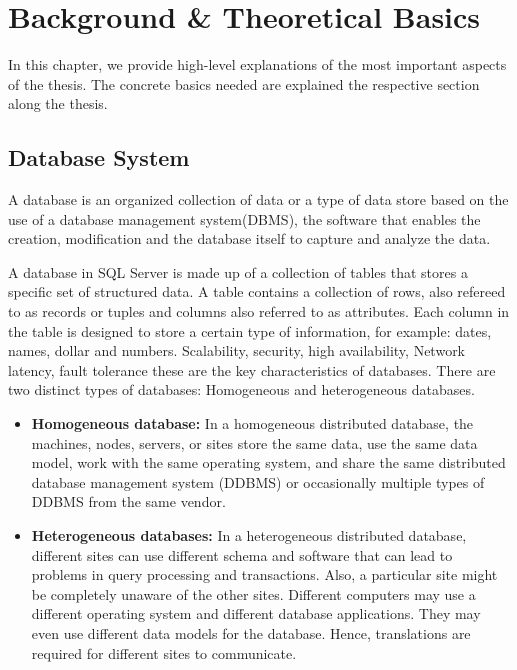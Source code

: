 \section{Background \& Theoretical Basics }

In this chapter, we provide high-level explanations of the most important aspects of the thesis. The concrete basics needed are explained the respective section along the thesis.

\subsection{ Database System}

\begin{definition}
A database is an organized collection of data or a type of data store based on the use of a database management system(DBMS), the software that enables the creation, modification and the database itself to capture and analyze the data.\end{definition}
A database in SQL Server is made up of a collection of tables that stores a specific set of structured data. A table contains a collection of rows, also refereed to as records or tuples and columns also referred to as attributes. Each column in the table is designed to store a certain type of information, for example: dates, names, dollar and numbers.\cite{williamdassafmsft-2024} Scalability, security, high availability, Network latency, fault tolerance these are the key characteristics of databases. There are two distinct types of databases: Homogeneous and heterogeneous databases.

\begin{itemize}
    \item \textbf{Homogeneous database:} In a homogeneous distributed database, the machines, nodes, servers, or sites store the same data, use the same data model, work with the same operating system, and share the same distributed database management system (DDBMS) or occasionally multiple types of DDBMS from the same vendor.\cite{mongodb-no-date}
    \item \textbf{Heterogeneous databases:} In a heterogeneous distributed database, different sites can use different schema and software that can lead to problems in query processing and transactions. Also, a particular site might be completely unaware of the other sites. Different computers may use a different operating system and different database applications. They may even use different data models for the database. Hence, translations are required for different sites to communicate.\cite{geeksforgeeks-2023}
\end{itemize}

